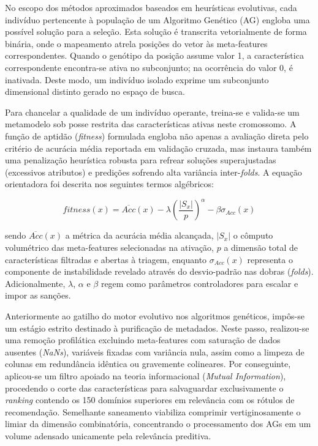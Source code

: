 \documentclass[12pt]{article}
\begin{document}
No escopo dos métodos aproximados baseados em heurísticas evolutivas, cada indivíduo pertencente à população de um Algoritmo Genético (AG) engloba uma possível solução para a seleção. Esta solução é transcrita vetorialmente de forma binária, onde o mapeamento atrela posições do vetor às meta-features correspondentes. Quando o genótipo da posição assume valor 1, a característica correspondente encontra-se ativa no subconjunto; na ocorrência do valor 0, é inativada. Deste modo, um indivíduo isolado exprime um subconjunto dimensional distinto gerado no espaço de busca.

Para chancelar a qualidade de um indivíduo operante, treina-se e valida-se um metamodelo sob posse restrita das características ativas neste cromossomo. A função de aptidão (\textit{fitness}) formulada engloba não apenas a avaliação direta pelo critério de acurácia média reportada em validação cruzada, mas instaura também uma penalização heurística robusta para refrear soluções superajustadas (excessivos atributos) e predições sofrendo alta variância inter-\textit{folds}. A equação orientadora foi descrita nos seguintes termos algébricos:

\[
fitness(x) = \overline{Acc}(x) - \lambda \left(\frac{|S_x|}{p}\right)^{\alpha} - \beta \sigma_{Acc}(x)
\]

sendo \(\overline{Acc}(x)\) a métrica da acurácia média alcançada, \(|S_x|\) o cômputo volumétrico das meta-features selecionadas na ativação, \(p\) a dimensão total de características filtradas e abertas à triagem, enquanto \(\sigma_{Acc}(x)\) representa o componente de instabilidade revelado através do desvio-padrão nas dobras (\textit{folds}). Adicionalmente, \(\lambda\), \(\alpha\) e \(\beta\) regem como parâmetros controladores para escalar e impor as sanções.

Anteriormente ao gatilho do motor evolutivo nos algoritmos genéticos, impôs-se um estágio estrito destinado à purificação de metadados. Neste passo, realizou-se uma remoção profilática excluindo meta-features com saturação de dados ausentes (\textit{NaNs}), variáveis fixadas com variância nula, assim como a limpeza de colunas em redundância idêntica ou gravemente colineares. Por conseguinte, aplicou-se um filtro apoiado na teoria informacional (\textit{Mutual Information}), procedendo o corte das características para salvaguardar exclusivamente o \textit{ranking} contendo os 150 domínios superiores em relevância com os rótulos de recomendação. Semelhante saneamento viabiliza comprimir vertiginosamente o limiar da dimensão combinatória, concentrando o processamento dos AGs em um volume adensado unicamente pela relevância preditiva.
\end{document}
